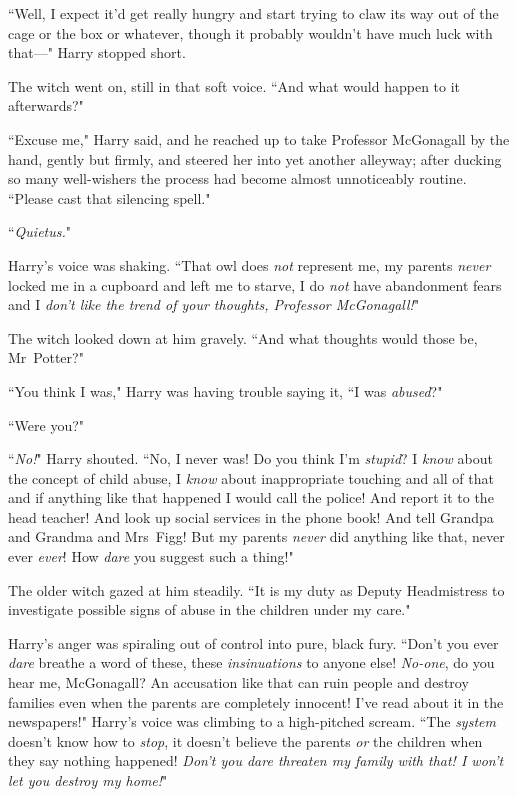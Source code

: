 ``Well, I expect it'd get really hungry and start trying to claw its way out of the cage or the box or whatever, though it probably wouldn't have much luck with that—" Harry stopped short.

The witch went on, still in that soft voice. ``And what would happen to it afterwards?"

``Excuse me," Harry said, and he reached up to take Professor McGonagall by the hand, gently but firmly, and steered her into yet another alleyway; after ducking so many well-wishers the process had become almost unnoticeably routine. ``Please cast that silencing spell."

``\emph{Quietus.}"

Harry's voice was shaking. ``That owl does \emph{not} represent me, my parents \emph{never} locked me in a cupboard and left me to starve, I do \emph{not} have abandonment fears and I \emph{don't like the trend of your thoughts, Professor McGonagall!}"

The witch looked down at him gravely. ``And what thoughts would those be, Mr~Potter?"

``You think I was," Harry was having trouble saying it, ``I was \emph{abused}?"

``Were you?"

``\emph{No!}" Harry shouted. ``No, I never was! Do you think I'm \emph{stupid}? I \emph{know} about the concept of child abuse, I \emph{know} about inappropriate touching and all of that and if anything like that happened I would call the police! And report it to the head teacher! And look up social services in the phone book! And tell Grandpa and Grandma and Mrs~Figg! But my parents \emph{never} did anything like that, never ever \emph{ever}! How \emph{dare} you suggest such a thing!"

The older witch gazed at him steadily. ``It is my duty as Deputy Headmistress to investigate possible signs of abuse in the children under my care."

Harry's anger was spiraling out of control into pure, black fury. ``Don't you ever \emph{dare} breathe a word of these, these \emph{insinuations} to anyone else! \emph{No-one}, do you hear me, McGonagall? An accusation like that can ruin people and destroy families even when the parents are completely innocent! I've read about it in the newspapers!" Harry's voice was climbing to a high-pitched scream. ``The \emph{system} doesn't know how to \emph{stop}, it doesn't believe the parents \emph{or} the children when they say nothing happened! \emph{Don't you dare threaten my family with that! I won't let you destroy my home!}"

